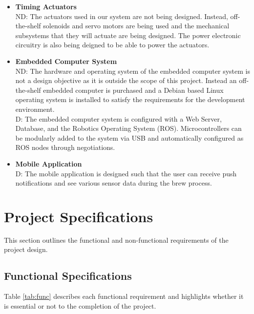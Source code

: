 \documentclass{article}
\begin{document}
\begin{itemize}
\item\textbf{Timing Actuators}
\\ND: The actuators used in our system are not being designed. Instead, off-the-shelf solenoids and servo motors are being used and the mechanical subsystems that they will actuate are being designed. The power electronic circuitry is also being deigned to be able to power the actuators.

\item\textbf{Embedded Computer System}
\\ND: The hardware and operating system of the embedded computer system is not a design objective as it is outside the scope of this project. Instead an off-the-shelf embedded computer is purchased and a Debian based Linux operating system is installed to satisfy the requirements for the development environment.
\\D: The embedded computer system is configured with a Web Server, Database, and the Robotics Operating System (ROS).  Microcontrollers can be modularly added to the system via USB and automatically configured as ROS nodes through negotiations.

\item\textbf{Mobile Application}
\\D: The mobile application is designed such that the user can receive push notifications and see various sensor data during the brew process.
\end{itemize}

\section{Project Specifications}
This section outlines the functional and non-functional requirements of the project design.
\subsection{Functional Specifications}
Table \ref{tab:func} describes each functional requirement and highlights whether it is essential or not to the completion of the project.
\end{document}
